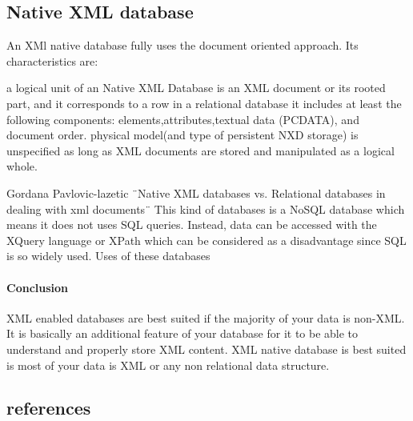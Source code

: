 \subsection{Native XML database}

An XMl native database fully uses the document oriented approach. Its characteristics are:

    a logical unit of an Native XML Database is an XML document or its rooted part, and it corresponds to a row in a relational database
    it includes at least the following components: elements,attributes,textual data (PCDATA), and document order.
    physical model(and type of persistent NXD storage) is unspecified as long as XML documents are stored and manipulated as a logical whole.

Gordana Pavlovic-lazetic ¨Native XML databases vs. Relational databases in dealing with xml documents¨
This kind of databases is a NoSQL database which means it does not uses SQL queries. Instead, data can be accessed with the XQuery language or XPath which can be considered as a disadvantage since SQL is so widely used.
Uses of these databases


\paragraph{Conclusion}
XML enabled databases are best suited if the majority of your data is non-XML. It is basically an additional feature of your database for it to be able to understand and properly store XML content. XML native database is best suited is most of your data is XML or any non relational data structure.
\subsection{references}

